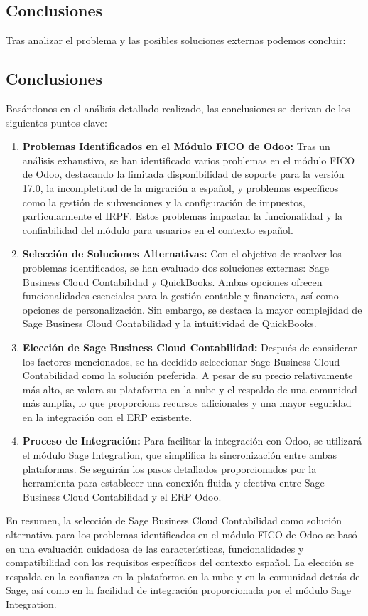 \subsection{Conclusiones}
Tras analizar el problema y las posibles soluciones externas podemos concluir:
\subsection{Conclusiones}

Basándonos en el análisis detallado realizado, las conclusiones se derivan de los siguientes puntos clave:

\begin{enumerate}
    \item \textbf{Problemas Identificados en el Módulo FICO de Odoo:} Tras un análisis exhaustivo, se han identificado varios problemas en el módulo FICO de Odoo, destacando la limitada disponibilidad de soporte para la versión 17.0, la incompletitud de la migración a español, y problemas específicos como la gestión de subvenciones y la configuración de impuestos, particularmente el IRPF. Estos problemas impactan la funcionalidad y la confiabilidad del módulo para usuarios en el contexto español.
    
    \item \textbf{Selección de Soluciones Alternativas:} Con el objetivo de resolver los problemas identificados, se han evaluado dos soluciones externas: Sage Business Cloud Contabilidad y QuickBooks. Ambas opciones ofrecen funcionalidades esenciales para la gestión contable y financiera, así como opciones de personalización. Sin embargo, se destaca la mayor complejidad de Sage Business Cloud Contabilidad y la intuitividad de QuickBooks.
    
    \item \textbf{Elección de Sage Business Cloud Contabilidad:} Después de considerar los factores mencionados, se ha decidido seleccionar Sage Business Cloud Contabilidad como la solución preferida. A pesar de su precio relativamente más alto, se valora su plataforma en la nube y el respaldo de una comunidad más amplia, lo que proporciona recursos adicionales y una mayor seguridad en la integración con el ERP existente.
    
    \item \textbf{Proceso de Integración:} Para facilitar la integración con Odoo, se utilizará el módulo Sage Integration, que simplifica la sincronización entre ambas plataformas. Se seguirán los pasos detallados proporcionados por la herramienta para establecer una conexión fluida y efectiva entre Sage Business Cloud Contabilidad y el ERP Odoo.
\end{enumerate}

En resumen, la selección de Sage Business Cloud Contabilidad como solución alternativa para los problemas identificados en el módulo FICO de Odoo se basó en una evaluación cuidadosa de las características, funcionalidades y compatibilidad con los requisitos específicos del contexto español. La elección se respalda en la confianza en la plataforma en la nube y en la comunidad detrás de Sage, así como en la facilidad de integración proporcionada por el módulo Sage Integration.
